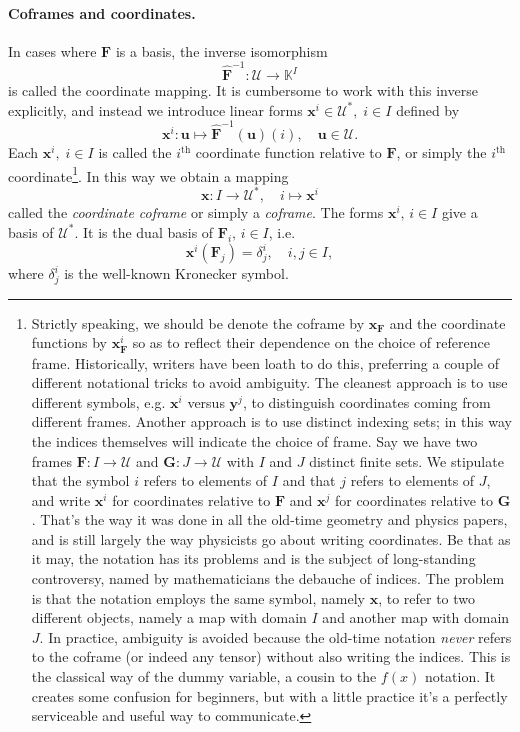 \documentclass[12pt]{article}
\newcommand{\cU}{\mathcal{U}}
\newcommand{\bF}{\mathbf{F}}
\newcommand{\bG}{\mathbf{G}}
\newcommand{\hbF}{\hat{\bF}}
\newcommand{\bu}{\mathbf{u}}
\newcommand{\bx}{\mathbf{x}}
\newcommand{\by}{\mathbf{y}}
\newcommand{\kfield}{\mathbb{K}}
\newcommand{\supth}{^{\text{th}}}
\begin{document}
\paragraph{Coframes and coordinates.}
In cases where $\bF$ is a basis, the inverse isomorphism
$$\hbF^{-1}:\cU\rightarrow \kfield^I$$
is called the coordinate
mapping.  It is cumbersome to work with this inverse explicitly, and
instead we introduce linear forms $\bx^i\in \cU^*,\; i\in I$ defined
by
$$\bx^i:\bu\mapsto \hbF^{-1}(\bu)(i),\quad \bu\in \cU.$$
Each
$\bx^i,\; i\in I$ is called the $i\supth$ coordinate function
relative to $\bF$, or simply the $i\supth$
coordinate\footnote{Strictly speaking, we should be denote the coframe
  by $\bx_\bF$ and the coordinate functions by $\bx^i_\bF$ so as
  to reflect their dependence on the choice of reference frame.
  Historically, writers have been loath to do this, preferring a
  couple of different notational tricks to avoid ambiguity.  The
  cleanest approach is to use different symbols, e.g.  $\bx^i$ versus
  $\by^j$, to distinguish coordinates coming from different frames.
  Another approach is to use distinct indexing sets; in this way the
  indices themselves will indicate the choice of frame.  Say we have
  two frames $\bF: I\rightarrow \cU$ and $\bG:J\rightarrow \cU$ with
  $I$ and $J$ distinct finite sets.  We stipulate that the symbol $i$
  refers to elements of $I$ and that $j$ refers to elements of $J$,
  and write $\bx^i$ for coordinates relative to $\bF$ and $\bx^j$ for
  coordinates relative to $\bG$.  That's the way it was done in all
  the old-time geometry and physics papers, and is still largely the
  way physicists go about writing coordinates.  Be that as it may, the
  notation has its problems and is the subject of long-standing
  controversy, named by mathematicians the debauche of indices. The
  problem is that the notation employs the same symbol, namely $\bx$,
  to refer to two different objects, namely a map with domain $I$ and
  another map with domain $J$.  In practice, ambiguity is 
  avoided because the old-time notation {\em never} refers to the
  coframe (or indeed any tensor) without also writing the indices.
  This is the classical way of the dummy variable, a cousin to the
  $f(x)$ notation.  It creates some confusion for beginners, but with
  a little practice it's a perfectly serviceable and useful way to
  communicate.}.  In this way we obtain a mapping
$$\bx:I\rightarrow \cU^*,\quad i\mapsto \bx^i$$
called the {\em
  coordinate coframe} or simply a {\em coframe}.  The forms $\bx^i,\,i
\in I$ give a basis of $\cU^*$. It is the dual basis of $\bF_i,\,i \in
I$, i.e.
$$\bx^i(\bF_j) = \delta^i_j,\quad i,j\in I,$$
where $\delta^i_j$ is the well-known Kronecker symbol.
\end{document}
